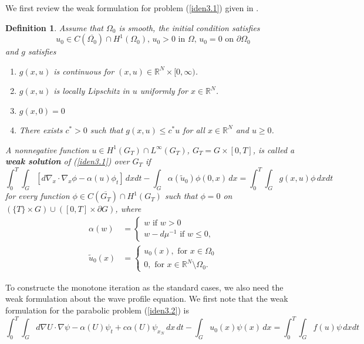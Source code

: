 \documentclass[12pt, a4paper]{article}
\newtheorem{defn}[thm]{Definition}
\numberwithin{equation}{section}
\newcommand{\R}{\mathbb{R}}
\newcommand{\named}[1]{\textnormal{\textbf{#1}}}
\begin{document}
\begin{CJK}{UTF8}{bkai}
	We first review the weak formulation for problem (\ref{iden3.1}) given in \cite{DG2012}.
\begin{defn}
	Assume that $\Omega_0$ is smooth, the initial condition satisfies
\begin{equation}
	u_0\in C(\overline{\Omega_0})\cap H^1(\Omega_0),\,u_0>0 \mbox{ in } \Omega,\, u_0=0 \mbox{ on }\partial\Omega_0
\end{equation} and $g$ satisfies 
\begin{enumerate}[$(i)$]
	\item $g(x,u)$ is continuous for $(x,u)\in \R^N\times[0,\infty)$.
	\item $g(x,u)$ is locally Lipschitz in $u$ uniformly for $x\in\R^N$.
	\item $g(x,0)=0$
	\item There exists $c^*>0$ such that $g(x,u)\leq c^*u$ for all $x\in\R^N$ and $u\geq 0$.
\end{enumerate}
A nonnegative function $u\in H^1(G_T)\cap L^\infty(G_T)$, $G_T=G\times[0,T]$, is called a \named{weak solution} of (\ref{iden3.1})  over $G_T$ if
\begin{equation}	\int_0^T\int_G[d\nabla_x\cdot\nabla_x\phi-\alpha(u)\phi_t]\,dxdt-\int_G\alpha(\tilde{u}_0)\phi(0,x)\,dx=\int_0^T\int_Gg(x,u)\phi\,dxdt
\end{equation}
for every function $\phi\in C(\overline{G_T})\cap H^1(G_T)$ such that $\phi=0$ on $(\{T\}\times G)\cup([0,T]\times\partial G)$, where
\begin{align}
	\alpha(w)&=\begin{cases}
		w\mbox{ if }w> 0\\
		w-d\mu^{-1}\mbox{ if }w\leq 0,
	\end{cases}\\
	\tilde{u}_0(x)&=\begin{cases}
		u_0(x),\mbox{ for }x\in\Omega_0\\
		0, \mbox{ for }x\in \R^N\setminus\Omega_0.
	\end{cases}
\end{align}
\end{defn}
	To constructe the monotone iteration as the standard cases, we also need the  weak formulation about the wave profile equation. We first note that the weak formulation for the parabolic problem (\ref{iden3.2}) is
\begin{equation}
	\int_0^T\int_Gd\nabla U\cdot\nabla\psi-\alpha(U)\psi_t+c\alpha(U)\psi_{x_N}\,dx\,dt-\int_Gu_0(x)\psi(x)\,dx=\int_0^T\int_G f(u)\psi\,dxdt
\end{equation}
	

\end{CJK}
\end{document}
